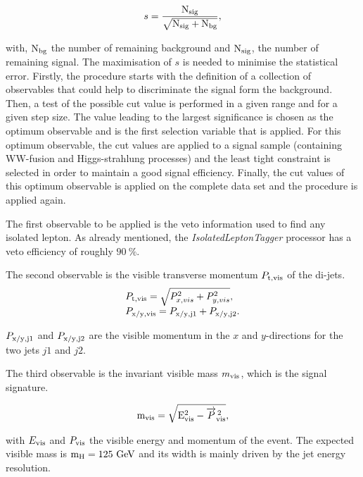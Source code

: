   \begin{equation}
    s = \frac{\rm{N_{sig}}}{\sqrt{\rm{N_{sig}}+ \rm{N_{bg}}}},
  \end{equation}

  with, $\rm{N_{bg}}$ the number of remaining background and $\rm{N_{sig}}$, the number of remaining signal.
  The maximisation of $s$ is needed to minimise the statistical error.
  Firstly, the procedure starts with the definition of a collection of observables that could help to discriminate the signal form the background.
  Then, a test of the possible cut value is performed in a given range and for a given step size.
  The value leading to the largest significance is chosen as the optimum observable and is the first selection variable that is applied.
  For this optimum observable, the cut values are applied to a signal sample (containing WW-fusion and Higgs-strahlung processes) and the least tight constraint is selected in order to maintain a good signal efficiency.
  Finally, the cut values of this optimum observable is applied on the complete data set and the procedure is applied again.

  The first observable to be applied is the veto information used to find any isolated lepton.
  As already mentioned, the \textit{IsolatedLeptonTagger} processor has a veto efficiency of roughly $90~\%$. 

  The second observable is the visible transverse momentum $P_{\rm{t,vis}}$ of the di-jets. 
  \begin{equation}
    \begin{array}{lcl}
      P_{\rm{t,vis}} = \sqrt{P^2_{x,vis} + P^2_{y,vis}}, \\
      P_{\rm{x/y,vis}} = P_{\rm{x/y,j1}} + P_{\rm{x/y,j2}}. 
    \end{array}
  \end{equation}
 
  $ P_{\rm{x/y,j1}}$ and $ P_{\rm{x/y,j2}}$ are the visible momentum in the $x$ and $y$-directions for the two jets $j1$ and $j2$.

  The third observable is the invariant visible mass $m_{\rm{vis}}$, which is the signal signature.

  \begin{equation}
   \rm{m_{vis}} = \sqrt{E^2_{\rm{vis}} - \overrightarrow{P}^{\,2}_{\rm{vis}}},
  \end{equation}

  with $E_{\rm{vis}}$ and $P_{\rm{vis}}$ the visible energy and momentum of the event.
  The expected visible mass is $\rm{m_H} = 125~\rm{GeV}$ and its width is mainly driven by the jet energy resolution.

